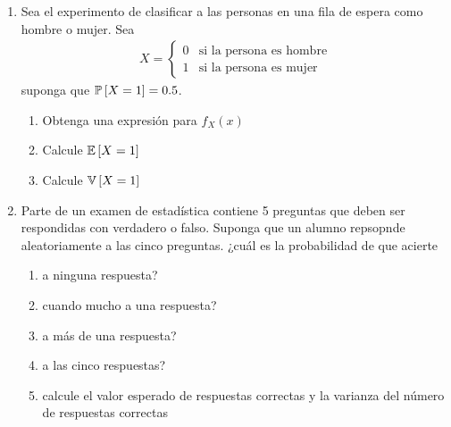 \begin{Ejer}
\begin{enumerate}
\item Sea el experimento de clasificar a las personas en una fila de espera como hombre o mujer. Sea 
\begin{eqnarray*}
X= \left\{ \begin{array}{ll}
0 & \textrm{si la persona es hombre}\\
1 & \textrm{si la persona es mujer}
\end{array} \right.
\end{eqnarray*}
suponga que $\mathbb{P}\left[X=1\right]=0.5$. 
\begin{enumerate}
\item Obtenga una expresión para $f_{X}\left(x\right)$
\item Calcule $\mathbb{E}\left[X=1\right]$
\item Calcule $\mathbb{V}\left[X=1\right]$
\end{enumerate}
\item Parte de un examen de estadística contiene 5 preguntas que deben ser respondidas con verdadero o falso. Suponga que un alumno repsopnde aleatoriamente a las cinco preguntas. ¿cuál es la probabilidad de que acierte
\begin{enumerate}
\item a ninguna respuesta?
\item cuando mucho a una respuesta?
\item a más de una respuesta?
\item a las cinco respuestas?
\item calcule el valor esperado de respuestas correctas y la varianza del número de respuestas correctas
\end{enumerate}


\end{enumerate}
\end{Ejer} 


